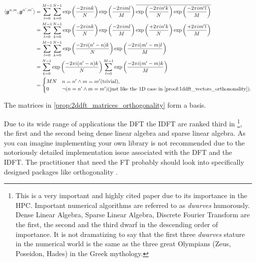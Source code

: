 \begin{Proof}
    \begin{equation}
        \begin{split}  
            \langle\boldsymbol{g}^{n,m},\boldsymbol{g}^{n',m'}\rangle &= \sum_{l=0}^{M-1}\sum_{k=0}^{N-1} \exp\left({\frac{-2\pi ink}{N}}\right)\exp\left({\frac{-2\pi iml}{M}}\right)\overline{\exp\left({\frac{-2\pi in'k}{N}}\right)\exp\left({\frac{-2\pi im'l}{M}}\right)}\\
            &= \sum_{l=0}^{M-1}\sum_{k=0}^{N-1} \exp\left({\frac{-2\pi ink}{N}}\right)\exp\left({\frac{-2\pi iml}{M}}\right)\exp\left({\frac{+2\pi in'k}{N}}\right)\exp\left({\frac{+2\pi im'l}{M}}\right)\\
            &= \sum_{l=0}^{M-1}\sum_{k=0}^{N-1} \exp\left({\frac{-2\pi i(n'-n)k}{N}}\right)\exp\left({\frac{-2\pi i(m'-m)l}{M}}\right)\\
            &= \sum_{k=0}^{N-1} \exp\left({\frac{-2\pi i(n'-n)k}{N}}\right)\sum_{l=0}^{M-1} \exp\left({\frac{-2\pi i(m'-m)k}{M}}\right)\\
            &=
            \begin{cases}
                MN & \text{$n = n' \wedge m=m'$}\text{(trivial)},\\
                0 & \text{$\neg(n = n' \wedge m=m')$}\text{(just like the 1D case in \cref{proof:1ddft_vectors_orthononality})}.
            \end{cases}  
        \end{split}
    \end{equation}    
\end{Proof}
\begin{Prop}
    The matrices in \cref{prop:2ddft_matrices_orthogonality} form a basis.
\end{Prop}
\begin{Rem}
Due to its wide range of applications the \ac{DFT} the \ac{IDFT} are ranked third in \cite{KARBBCJGPHKKDPWLPJSSWWKY2006}
\footnote{This is a very important and highly cited paper due to its importance in the \ac{HPC}. Important numerical algorithms
are referred to as \emph{dwarves} humorously. Dense Linear Algebra, Sparse Linear Algebra, 
Discrete Fourier Transform are the first, the second and the third dwarf in the descending order of importance. 
It is not dramatizing to say that the first three \emph{dwarves} stature in the numerical world 
is the same as the three great Olympians (Zeus, Poseidon, Hades) in the Greek mythology.}, the first and the 
second being dense linear algebra and sparse linear algebra. As you can imagine implementing your own library is not recommended due to the notoriously detailed implementation issue associated with the \ac{DFT} and the \ac{IDFT}. 
The practitioner that need the \ac{FT} probably should look into specifically designed packages like \cite{KARBBCJGPHKKDPWLPJSSWWKY2006} orthogonality \cite{VGOHRCBPWBWBWMMNJKLCPFMVLPCHQHARPM2020}.
\end{Rem}
